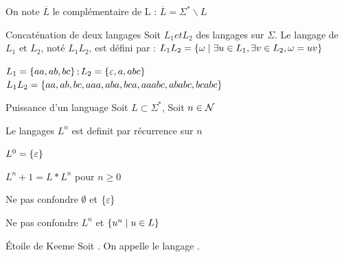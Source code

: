     \begin{notation}
        On note $\overline{L}$ le complémentaire de L :
        $\overline{L} = \Sigma^* \backslash L$
    \end{notation}
    
    \begin{definition}{Concaténation de deux langages}{}
        Soit $L_1 et L_2$ des langages sur $\Sigma$.
        Le langage   de $L_1$ et $L_2$, noté $L_1 L_2$, est défini par :
        $L_1 L_2 = \left\{\omega \;\middle\vert\; \exists u \in L_1, \exists v \in L_2, \omega = uv\right\}$
    \end{definition}
    
    \begin{example}{}{}
        $L_1 = \left\{aa, ab, bc\right\} ; L_2 = \left\{\varepsilon, a, abc\right\}$
        $L_1 L_2 = \left\{aa, ab, bc, aaa, aba, bca, aaabc, ababc, bcabc\right\}$
    \end{example}
    
    \begin{definition}{Puissance d'un language }
        Soit $L \subset \Sigma^*$, Soit $n\in \mathcal{N}$  
        
        
        Le langages $L^n$ est definit par récurrence sur $n$
        \begin{enumerate}{}{}
            
            \itt $L^0 = \left\{ \varepsilon\right\}$
            
            \itt %
                $L^n+1 = L * L^n $ pour $n \geq 0$ 
                
        \end{enumerate}{}
        
    \end{definition}
    
    \begin{warning}{}{}
        \begin{enumerate}
            \itast Ne pas confondre $\emptyset$ et $\left\{\varepsilon\right\}$
            
            \itast Ne pas confondre $L^n$ et $\left\{u^n \;\middle\vert\; u \in L\right\}$
        \end{enumerate}
    \end{warning}
    
    \begin{definition}{Étoile de Keeme}{}
        Soit . On appelle  le langage .
    \end{definition}
    
